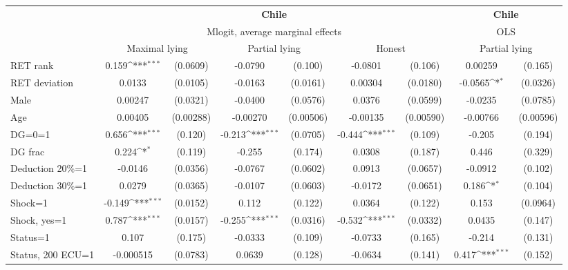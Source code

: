 \def\sym#1{\ifmmode^{#1}\else\(^{#1}\)\fi}
\begin{tabular}{l|cccccc|cc}
\hline\hline
&\multicolumn{6}{c|}{\bf Chile}&\multicolumn{2}{c}{\bf Chile}\\ &\multicolumn{6}{c|}{Mlogit, average marginal effects }&\multicolumn{2}{c}{OLS}\\
                &\multicolumn{2}{c}{Maximal lying}&\multicolumn{2}{c}{Partial lying}&\multicolumn{2}{c}{Honest}  &\multicolumn{2}{c}{Partial lying}\\
\hline
RET rank        &    0.159\sym{***}& (0.0609)&  -0.0790         &  (0.100)&  -0.0801         &  (0.106)&  0.00259         &  (0.165)\\
RET deviation   &   0.0133         & (0.0105)&  -0.0163         & (0.0161)&  0.00304         & (0.0180)&  -0.0565\sym{*}  & (0.0326)\\
Male            &  0.00247         & (0.0321)&  -0.0400         & (0.0576)&   0.0376         & (0.0599)&  -0.0235         & (0.0785)\\
Age             &  0.00405         &(0.00288)& -0.00270         &(0.00506)& -0.00135         &(0.00590)& -0.00766         &(0.00596)\\
DG=0=1          &    0.656\sym{***}&  (0.120)&   -0.213\sym{***}& (0.0705)&   -0.444\sym{***}&  (0.109)&   -0.205         &  (0.194)\\
DG frac         &    0.224\sym{*}  &  (0.119)&   -0.255         &  (0.174)&   0.0308         &  (0.187)&    0.446         &  (0.329)\\
Deduction 20\%=1&  -0.0146         & (0.0356)&  -0.0767         & (0.0602)&   0.0913         & (0.0657)&  -0.0912         &  (0.102)\\
Deduction 30\%=1&   0.0279         & (0.0365)&  -0.0107         & (0.0603)&  -0.0172         & (0.0651)&    0.186\sym{*}  &  (0.104)\\
Shock=1         &   -0.149\sym{***}& (0.0152)&    0.112         &  (0.122)&   0.0364         &  (0.122)&    0.153         & (0.0964)\\
Shock, yes=1    &    0.787\sym{***}& (0.0157)&   -0.255\sym{***}& (0.0316)&   -0.532\sym{***}& (0.0332)&   0.0435         &  (0.147)\\
Status=1        &    0.107         &  (0.175)&  -0.0333         &  (0.109)&  -0.0733         &  (0.165)&   -0.214         &  (0.131)\\
Status, 200 ECU=1&-0.000515         & (0.0783)&   0.0639         &  (0.128)&  -0.0634         &  (0.141)&    0.417\sym{***}&  (0.152)\\

\end{tabular}
